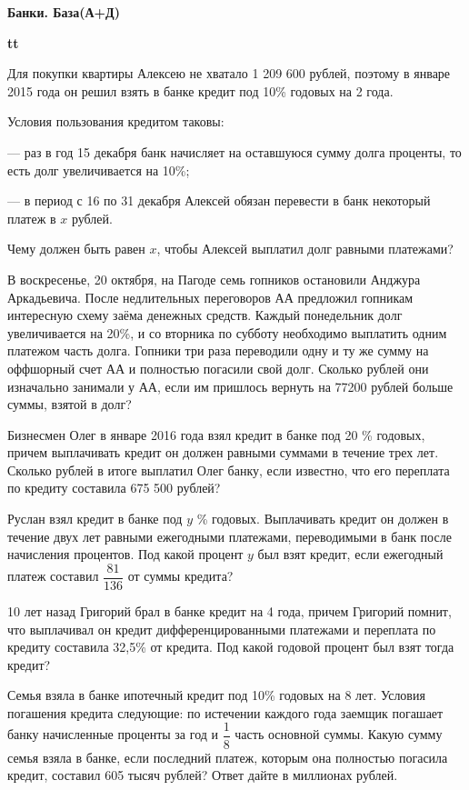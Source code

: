 \centerline{\bf \Huge Банки. База(А+Д)}
\centerline{\bf \Huge }

\begin{flushright}
        \scriptsize{\textbf{tt}}
\end{flushright}

 Для покупки квартиры Алексею не хватало 1 209 600 рублей, поэтому в январе 2015 года
он решил взять в банке кредит под 10\% годовых на 2 года. 

Условия пользования кредитом таковы:

— раз в год 15 декабря банк начисляет на оставшуюся сумму долга проценты, то есть долг
увеличивается на 10\%;

— в период с 16 по 31 декабря Алексей обязан перевести в банк некоторый платеж в $x$
рублей.

Чему должен быть равен $x$, чтобы Алексей выплатил долг равными платежами?

 В воскресенье, 20 октября, на Пагоде семь гопников остановили Анджура Аркадьевича. После недлительных переговоров АА предложил гопникам интересную схему заёма денежных средств. Каждый понедельник долг увеличивается на 20\%, и со вторника по субботу необходимо выплатить одним платежом часть долга. Гопники три раза переводили одну и ту же сумму на оффшорный счет АА и полностью погасили свой долг. Сколько рублей они изначально занимали у АА, если им пришлось вернуть на 77200 рублей больше суммы, взятой в долг?

 Бизнесмен Олег в январе 2016 года взял кредит в банке под 20 \% годовых, причем выплачивать кредит он должен равными суммами в течение трех лет. Сколько рублей в итоге
выплатил Олег банку, если известно, что его переплата по кредиту составила 675 500 рублей?

 Руслан взял кредит в банке под $y$ \% годовых. Выплачивать кредит он должен в течение
двух лет равными ежегодными платежами, переводимыми в банк после начисления процентов.
Под какой процент $y$ был взят кредит, если ежегодный платеж составил $\dfrac{81}{136}$ от суммы кредита?

 10 лет назад Григорий брал в банке кредит на 4 года, причем Григорий помнит, что
выплачивал он кредит дифференцированными платежами и переплата по кредиту составила
32,5\% от кредита. Под какой годовой процент был взят тогда кредит?

 Семья взяла в банке ипотечный кредит под 10\% годовых на 8 лет. Условия погашения
кредита следующие: по истечении каждого года заемщик погашает банку начисленные проценты за год и $\dfrac{1}{8}$ часть основной суммы. Какую сумму семья взяла в банке, если последний
платеж, которым она полностью погасила кредит, составил 605 тысяч рублей? Ответ дайте в
миллионах рублей.

